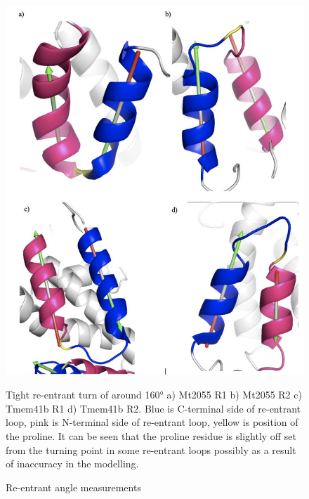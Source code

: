 \begin{figure}[th!]
    \centering
    \includegraphics[width=125mm, scale =0.5]{Results/re_angles.png}
    \caption{Re-entrant angle measurements}
    \label{fig:angles}
    \small
    Tight re-entrant turn of around 160° a) Mt2055 R1 b) Mt2055 R2 c) Tmem41b R1 d) Tmem41b R2. Blue is C-terminal side of re-entrant loop, pink is N-terminal side of re-entrant loop, yellow is position of the proline. It can be seen that the proline residue is slightly off set from the turning point in some re-entrant loops possibly as a result of inaccuracy in the modelling.
\end{figure}

